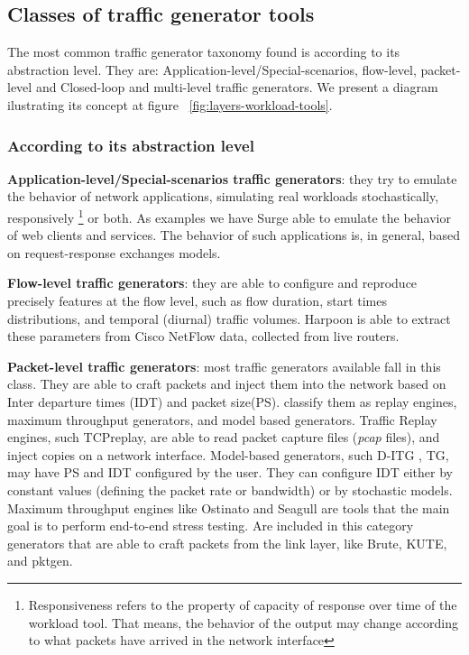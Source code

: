 \subsection{Classes of traffic generator tools}

The most common traffic generator taxonomy found is  according to its abstraction level\cite{do-you-trust}. They are: Application-level/Special-scenarios, flow-level, packet-level and Closed-loop and multi-level traffic generators. We present a diagram  ilustrating its concept at figure ~\ref{fig:layers-workload-tools}.


\subsubsection{According to its abstraction level}

\textbf{Application-level/Special-scenarios traffic generators}: they try to emulate the behavior of network applications, simulating real workloads stochastically, responsively \footnote{Responsiveness refers to the property of capacity of response over time of the workload tool. That means, the behavior of the output may change according to what packets have arrived in the network interface} or both. As examples we have Surge\cite{surge-paper} able to emulate the behavior of web clients and services. The behavior of such applications is, in general, based on request-response exchanges models.



\textbf{Flow-level traffic generators}: they are able to configure and reproduce precisely features at the flow level\cite{do-you-trust}\cite{sourcesonoff-paper}, such as flow duration, start times distributions, and temporal (diurnal) traffic volumes\cite{do-you-trust}. Harpoon \cite{harpoon-paper} is able to extract these parameters from Cisco NetFlow data, collected from live routers.

\textbf{Packet-level traffic generators}: most traffic generators available fall in this class. They are able to craft packets and inject them into the network based on Inter departure times (IDT) and packet size(PS). \cite{validate-trafficgen} classify them as replay engines, maximum throughput generators, and model based generators. Traffic Replay engines, such TCPreplay\cite{web-tcpreplay}, are  able to read packet capture files (\textit{pcap} files), and inject copies on a network interface. Model-based generators, such D-ITG \cite{ditg-paper}, TG\cite{web-tg}, may have PS and IDT configured by the user. They can configure IDT  either by constant values (defining the packet rate or bandwidth) or by stochastic models. Maximum throughput engines like Ostinato and Seagull are tools that the main goal is to perform end-to-end stress testing. Are included in this category generators that are able to craft packets from the link layer, like Brute\cite{web-brute}, KUTE\cite{web-brute}, and pktgen\cite{web-pktgen}.

